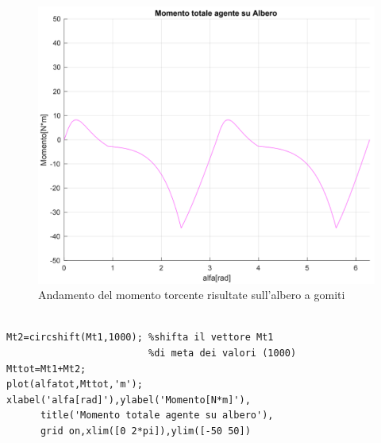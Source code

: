 \begin{figure}[h]
    \centering
    \includegraphics[scale=0.4]{Immagini/GraficoMomentoTotale.png}
    \caption{Andamento del momento torcente risultate sull'albero a gomiti}
    \label{fig:GraficoMomentoTotale}
\end{figure}
\begin{lstlisting}[frame=trBL]
%Grafico momento torcente totale

Mt2=circshift(Mt1,1000); %shifta il vettore Mt1 
                         %di meta dei valori (1000)
Mttot=Mt1+Mt2;
plot(alfatot,Mttot,'m');
xlabel('alfa[rad]'),ylabel('Momento[N*m]'),
      title('Momento totale agente su albero'),
      grid on,xlim([0 2*pi]),ylim([-50 50])
\end{lstlisting}

